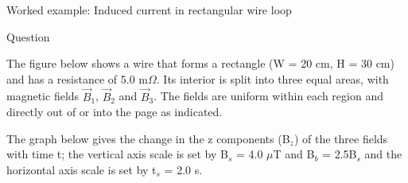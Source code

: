 {
\problemslide

%
%
%

\begin{frame}{Worked example: Induced current in rectangular wire loop}

  \begin{blockexmplque}{Question}

    The figure below shows a wire that forms a rectangle (W = 20 cm, H = 30 cm)
    and has a resistance of 5.0 m$\Omega$. Its interior is split into three
    equal areas, with magnetic fields $\vec{B}_{1}$, $\vec{B}_{2}$ and $\vec{B}_{3}$.
    The fields are uniform within each region and directly
    out of or into the page as indicated.

    The graph below gives the change in the z components (B$_{z}$)
    of the three fields with time t;
    the vertical axis scale is set by
    B$_{s}$ = 4.0 $\mu$T and B$_{b}$ = 2.5B$_{s}$
    and the horizontal axis scale is set by t$_{s}$ = 2.0 s.


\end{blockexmplque}
\end{frame}}

